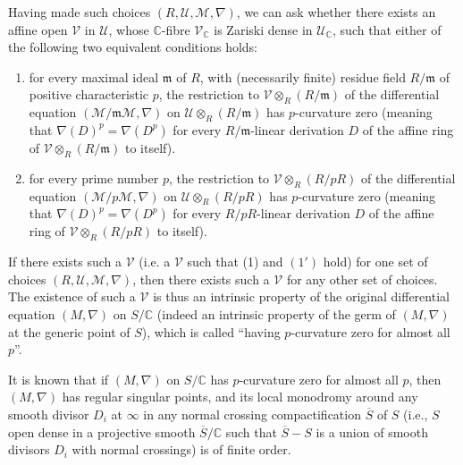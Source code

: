 Having made such choices \((R,\mathcal{U},\mathcal{M},\nabla)\), we can ask whether there exists an affine open \(\mathcal{V}\) in \(\mathcal{U}\), whose \(\mathbb{C}\)-fibre \(\mathcal{V}_{\mathbb{C}}\) is Zariski dense in \(\mathcal{U}_{\mathbb{C}}\), such that either of the following two equivalent conditions holds:
\begin{enumerate}[label=(\arabic*)]
\item for every maximal ideal \(\mathfrak{m}\) of \(R\), with (necessarily finite) residue field \(R/\mathfrak{m}\) of positive characteristic \(p\), the restriction to \(\mathcal{V}\otimes_R(R/\mathfrak{m})\) of the differential equation \((\mathcal{M}/\mathfrak{m}\mathcal{M},\nabla)\) on \(\mathcal{U}\otimes_R(R/\mathfrak{m})\) has \(p\)-curvature zero (meaning that \(\nabla(D)^p=\nabla(D^p)\) for every \(R/\mathfrak{m}\)-linear derivation \(D\) of the affine ring of \(\mathcal{V}\otimes_R(R/\mathfrak{m})\) to itself).
\item[\((1')\)] for every prime number \(p\), the restriction to \(\mathcal{V}\otimes_R(R/pR)\) of the differential equation \((\mathcal{M}/p\mathcal{M},\nabla)\) on \(\mathcal{U}\otimes_R(R/pR)\) has \(p\)-curvature zero (meaning that \(\nabla(D)^p=\nabla(D^p)\) for every \(R/pR\)-linear derivation \(D\) of the affine ring of \(\mathcal{V}\otimes_R(R/pR)\) to itself).
\end{enumerate}

If there exists such a \(\mathcal{V}\) (i.e. a \(\mathcal{V}\) such that (1) and \((1')\) hold) for one set of choices \((R,\mathcal{U},\mathcal{M},\nabla)\), then there exists such a \(\mathcal{V}\) for any other set of choices. The existence of such a \(\mathcal{V}\) is thus an intrinsic property of the original differential equation \((M,\nabla)\) on \(S/\mathbb{C}\) (indeed an intrinsic property of the germ of \((M,\nabla)\) at the generic point of \(S\)), which is called ``having \(p\)-curvature zero for almost all \(p\)''.

It is known \cite[13.0]{Ka-NCMT} that if \((M,\nabla)\) on \(S/\mathbb{C}\) has \(p\)-curvature zero for almost all \(p\), then \((M,\nabla)\) has regular singular points, and its local monodromy around any smooth divisor \(D_i\) at \(\infty\) in any normal crossing compactification \(\overline{S}\) of \(S\) (i.e., \(S\) open dense in a projective smooth \(\overline{S}/\mathbb{C}\) such that \(\overline{S}-S\) is a union of smooth divisors \(D_i\) with normal crossings) is of finite order.

